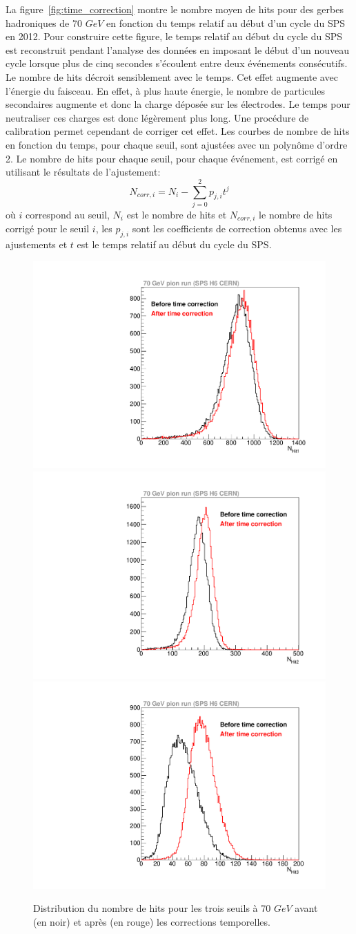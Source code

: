 La figure~\ref{fig:time_correction} montre le nombre moyen de hits pour des gerbes hadroniques de 70 $GeV$ en fonction du temps relatif au début d'un cycle du SPS en 2012. Pour construire cette figure, le temps relatif au début du cycle du SPS est reconstruit pendant l'analyse des données en imposant le début d'un nouveau cycle lorsque plus de cinq secondes s'écoulent entre deux événements consécutifs. Le nombre de hits décroit sensiblement avec le temps. Cet effet augmente avec l'énergie du faisceau. En effet, à plus haute énergie, le nombre de particules secondaires augmente et donc la charge déposée sur les électrodes. Le temps pour neutraliser ces charges est donc légèrement plus long. Une procédure de calibration permet cependant de corriger cet effet. Les courbes de nombre de hits en fonction du temps, pour chaque seuil, sont ajustées avec un polynôme d'ordre 2. Le nombre de hits pour chaque seuil, pour chaque événement, est corrigé en utilisant le résultats de l'ajustement:
\begin{equation}
  N_{corr,i}=N_i-\sum_{j=0}^{2}p_{j,i}t^j
\end{equation}
où $i$ correspond au seuil, $N_i$ est le nombre de hits et $N_{corr,i}$ le nombre de hits corrigé pour le seuil $i$, les $p_{j,i}$ sont les coefficients de correction obtenus avec les ajustements et $t$ est le temps relatif au début du cycle du SPS.
\begin{figure}[!ht]
  \begin{center}
    \includegraphics[width=.32\textwidth]{SDHCAL/figs/time_corr1.pdf}
    \includegraphics[width=.32\textwidth]{SDHCAL/figs/time_corr2.pdf}
    \includegraphics[width=.32\textwidth]{SDHCAL/figs/time_corr3.pdf}
    \caption{Distribution du nombre de hits pour les trois seuils à 70 $GeV$ avant (en noir) et après (en rouge) les corrections temporelles.}
    \label{fig:nhit_corrected}
  \end{center}
\end{figure}
